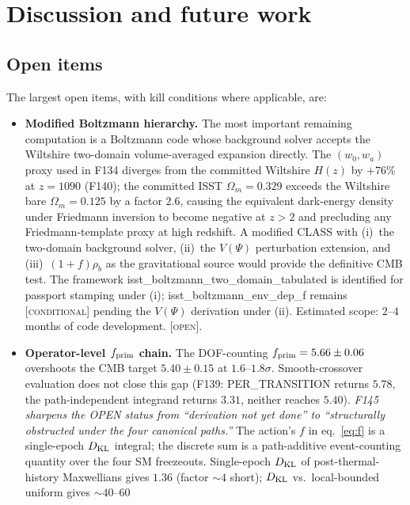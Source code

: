 \documentclass[aps,prd,twocolumn,nofootinbib,floatfix,superscriptaddress]{revtex4-2}
\newcommand{\OPEN}{{\color{black!60!red}\textsc{[open]}}}
\newcommand{\fprim}{f_{\rm prim}}
\begin{document}
\section{Discussion and future work}
\label{sec:future}

\subsection{Open items}

The largest open items, with kill conditions where applicable, are:

\begin{itemize}
\item \textbf{Modified Boltzmann hierarchy.} The most important
remaining computation is a Boltzmann code whose background solver
accepts the Wiltshire two-domain volume-averaged expansion directly.
The $(w_0, w_a)$ proxy used in F134 diverges from the committed
Wiltshire $H(z)$ by $+76\%$ at $z = 1090$ (F140); the committed
ISST $\Omega_m = 0.329$ exceeds the Wiltshire bare $\Omega_m = 0.125$
by a factor $2.6$, causing the equivalent dark-energy density under
Friedmann inversion to become negative at $z > 2$ and precluding
any Friedmann-template proxy at high redshift. A modified CLASS
with (i)~the two-domain background solver, (ii)~the $V(\Psi)$
perturbation extension, and (iii)~$(1{+}f)\rho_b$ as the gravitational
source would provide the definitive CMB test. The framework
\textsf{isst\_boltzmann\_two\_domain\_tabulated} is identified for
passport stamping under (i); \textsf{isst\_boltzmann\_env\_dep\_f}
remains \textsc{[conditional]} pending the $V(\Psi)$ derivation
under (ii). Estimated scope: $2$--$4$ months of code development.
\OPEN.
\item \textbf{Operator-level $\fprim$ chain.} The DOF-counting
$\fprim = 5.66\pm 0.06$ overshoots the CMB target $5.40\pm 0.15$ at
$1.6$--$1.8\sigma$. Smooth-crossover evaluation does not close this
gap (F139: PER\_TRANSITION returns $5.78$, the path-independent
integrand returns $3.31$, neither reaches $5.40$). \emph{F145
sharpens the OPEN status from ``derivation not yet done'' to
``structurally obstructed under the four canonical paths.''} The
action's $f$ in eq.~\ref{eq:f} is a single-epoch $D_{\rm KL}$
integral; the discrete sum is a path-additive event-counting
quantity over the four SM freezeouts. Single-epoch $D_{\rm KL}$ of
post-thermal-history Maxwellians gives $1.36$ (factor $\sim 4$
short); $D_{\rm KL}$ vs.\ local-bounded uniform gives $\sim 40$--$60$

\end{itemize}
\end{document}
